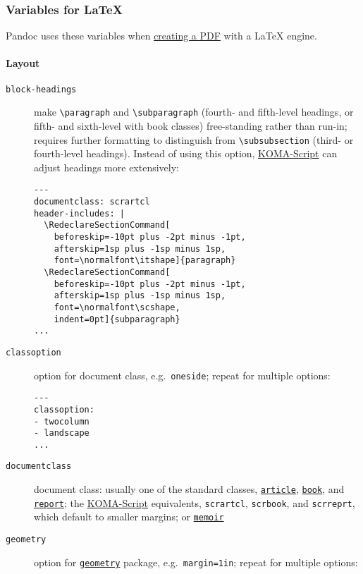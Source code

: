 \documentclass[]{article}
\begin{document}
\hypertarget{variables-for-latex}{%
\subsubsection{Variables for LaTeX}\label{variables-for-latex}}

Pandoc uses these variables when
\protect\hyperlink{creating-a-pdf}{creating a PDF} with a LaTeX engine.

\hypertarget{layout}{%
\paragraph{Layout}\label{layout}}

\begin{description}
\item[\texttt{block-headings}]
make \texttt{\textbackslash{}paragraph} and
\texttt{\textbackslash{}subparagraph} (fourth- and fifth-level headings,
or fifth- and sixth-level with book classes) free-standing rather than
run-in; requires further formatting to distinguish from
\texttt{\textbackslash{}subsubsection} (third- or fourth-level
headings). Instead of using this option,
\href{https://ctan.org/pkg/koma-script}{KOMA-Script} can adjust headings
more extensively:

\begin{verbatim}
---
documentclass: scrartcl
header-includes: |
  \RedeclareSectionCommand[
    beforeskip=-10pt plus -2pt minus -1pt,
    afterskip=1sp plus -1sp minus 1sp,
    font=\normalfont\itshape]{paragraph}
  \RedeclareSectionCommand[
    beforeskip=-10pt plus -2pt minus -1pt,
    afterskip=1sp plus -1sp minus 1sp,
    font=\normalfont\scshape,
    indent=0pt]{subparagraph}
...
\end{verbatim}
\item[\texttt{classoption}]
option for document class, e.g.~\texttt{oneside}; repeat for multiple
options:

\begin{verbatim}
---
classoption:
- twocolumn
- landscape
...
\end{verbatim}
\item[\texttt{documentclass}]
document class: usually one of the standard classes,
\href{https://ctan.org/pkg/article}{\texttt{article}},
\href{https://ctan.org/pkg/book}{\texttt{book}}, and
\href{https://ctan.org/pkg/report}{\texttt{report}}; the
\href{https://ctan.org/pkg/koma-script}{KOMA-Script} equivalents,
\texttt{scrartcl}, \texttt{scrbook}, and \texttt{scrreprt}, which
default to smaller margins; or
\href{https://ctan.org/pkg/memoir}{\texttt{memoir}}
\item[\texttt{geometry}]
option for \href{https://ctan.org/pkg/geometry}{\texttt{geometry}}
package, e.g.~\texttt{margin=1in}; repeat for multiple options:


\end{description}
\end{document}
